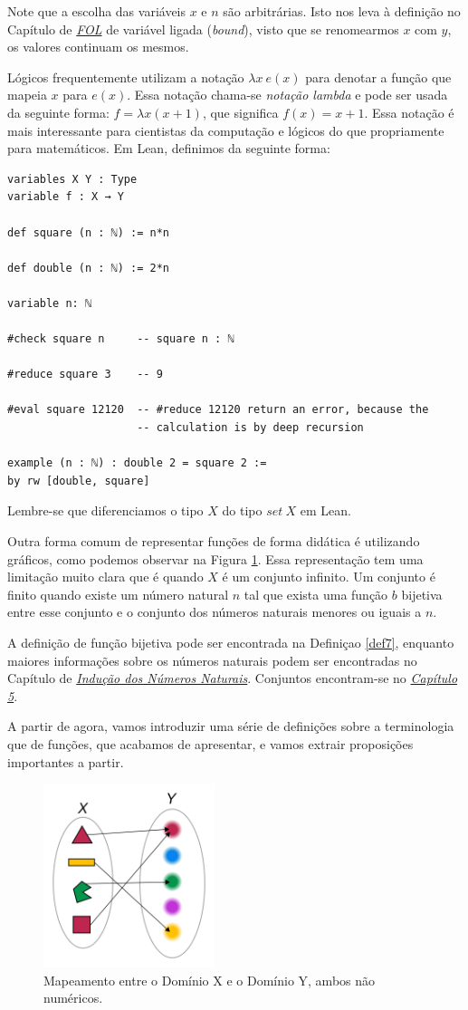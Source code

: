 Note que a escolha das variáveis $x$ e $n$ são arbitrárias. Isto nos leva à
definição no Capítulo de \textit{\hyperlink{chapter.4}{FOL}} de variável
ligada (\textit{bound}), visto que se renomearmos $x$ com $y$, os valores
continuam os mesmos.

Lógicos frequentemente utilizam a notação $\lambda x ~e(x)$ para denotar a
função que mapeia $x$ para $e(x)$. Essa notação chama-se \textit{notação
lambda} e pode ser usada da seguinte forma: $f = \lambda x(x + 1)$, que
significa $f(x) = x + 1$. Essa notação é mais interessante para cientistas da
computação e lógicos do que propriamente para matemáticos. Em Lean, definimos
da seguinte forma:

\begin{lstlisting}
variables X Y : Type
variable f : X → Y

def square (n : ℕ) := n*n 

def double (n : ℕ) := 2*n

variable n: ℕ 

#check square n     -- square n : ℕ 

#reduce square 3    -- 9

#eval square 12120  -- #reduce 12120 return an error, because the 
                    -- calculation is by deep recursion

example (n : ℕ) : double 2 = square 2 :=
by rw [double, square]
\end{lstlisting}

Lembre-se que diferenciamos o tipo $X$ do tipo $set~X$ em Lean.

Outra forma comum de representar funções de forma didática é utilizando
gráficos, como podemos observar na Figura \ref{fig:functions-01-00}. Essa
representação tem uma limitação muito clara que é quando $X$ é um conjunto
infinito. Um conjunto é finito quando existe um número natural $n$ tal que
exista uma função $b$ bijetiva entre esse conjunto e o conjunto dos números
naturais menores ou iguais a $n$. 

A definição de função bijetiva pode ser encontrada na Definiçao \ref{def7},
enquanto maiores informações sobre os números naturais podem ser encontradas
no Capítulo de \textit{\hyperlink{chapter.8}{Indução dos Números Naturais}}.
Conjuntos encontram-se no \textit{\hyperlink{chapter.5}{Capítulo 5}}.

A partir de agora, vamos introduzir uma série de definições sobre a
terminologia que de funções, que acabamos de apresentar, e vamos extrair
proposições importantes a partir. 

\begin{figure}
    \centering      
    \includegraphics[width = 5cm]{figures/functions/fig-functions-01-00.png}
    \caption{Mapeamento entre o Domínio X e o Domínio Y, ambos não numéricos.}
    \label{fig:functions-01-00}
\end{figure}